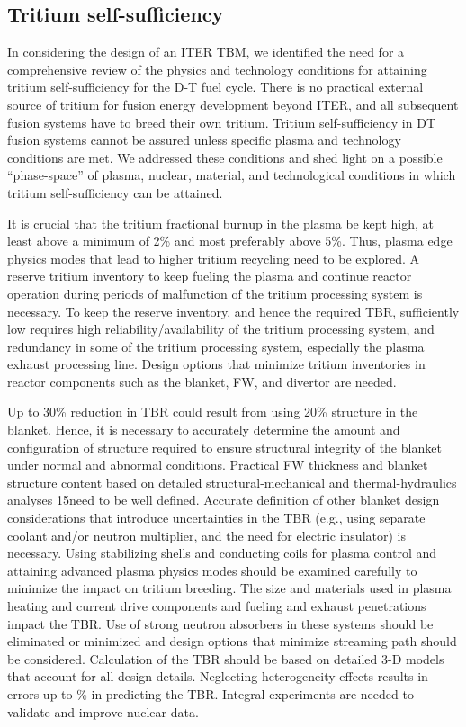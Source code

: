 \subsection{Tritium self-sufficiency}

In considering the design of an ITER \gls{TBM}, we identified the need for a
comprehensive review of the physics and technology conditions for attaining
tritium self-sufficiency for the D-T fuel cycle.  There is no practical
external source of tritium for fusion energy development beyond ITER, and all
subsequent fusion systems have to breed their own tritium. Tritium
self-sufficiency in DT fusion systems cannot be assured unless specific plasma
and technology conditions are met. We addressed these conditions and shed
light on a possible “phase-space” of plasma, nuclear, material, and
technological conditions in which tritium self-sufficiency can be attained.

It is crucial that the tritium fractional burnup in the plasma be kept high,
at least above a minimum of 2\% and most preferably above 5\%. Thus, plasma
edge physics modes that lead to higher tritium recycling need to be
explored. A reserve tritium inventory to keep fueling the plasma and continue
reactor operation during periods of malfunction of the tritium processing
system is necessary. To keep the reserve inventory, and hence the required
\gls{TBR}, sufficiently low requires high reliability/availability of the
tritium processing system, and redundancy in some of the tritium processing
system, especially the plasma exhaust processing line. Design options that
minimize tritium inventories in reactor components such as the blanket, FW,
and divertor are needed.

Up to 30\% reduction in \gls{TBR} could result from using 20\% structure in
the blanket. Hence, it is necessary to accurately determine the amount and
configuration of structure required to ensure structural integrity of the
blanket under normal and abnormal conditions. Practical FW thickness and
blanket structure content based on detailed structural-mechanical and
thermal-hydraulics analyses 15need to be well defined. Accurate definition of
other blanket design considerations that introduce uncertainties in the
\gls{TBR} (e.g., using separate coolant and/or neutron multiplier, and the
need for electric insulator) is necessary. Using stabilizing shells and
conducting coils for plasma control and attaining advanced plasma physics
modes should be examined carefully to minimize the impact on tritium
breeding. The size and materials used in plasma heating and current drive
components and fueling and exhaust penetrations impact the \gls{TBR}. Use of
strong neutron absorbers in these systems should be eliminated or minimized
and design options that minimize streaming path should be
considered. Calculation of the \gls{TBR} should be based on detailed 3-D
models that account for all design details. Neglecting heterogeneity effects
results in errors up to \% in predicting the \gls{TBR}.
Integral experiments are needed to validate and improve nuclear data.

